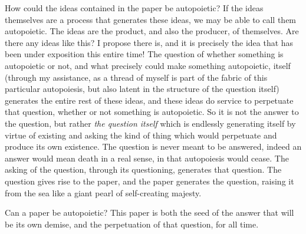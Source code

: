 \documentclass[12pt]{scrartcl}
\begin{document}
How could the ideas contained in the paper be autopoietic?  If the ideas themselves are a process that generates these ideas, we may be able to call them autopoietic.  The ideas are the product, and also the producer, of themselves.  Are there any ideas like this?  I propose there is, and it is precisely the idea that has been under exposition this entire time!  The question of whether something is autopoietic or not, and what precisely could make something autopoietic, itself (through my assistance, as a thread of myself is part of the fabric of this particular autopoiesis, but also latent in the structure of the question itself) generates the entire rest of these ideas, and these ideas do service to perpetuate that question, whether or not something is autopoietic.  So it is not the answer to the question, but rather \emph{the question itself} which is endlessly generating itself by virtue of existing and asking the kind of thing which would perpetuate and produce its own existence.  The question is never meant to be answered, indeed an answer would mean death in a real sense, in that autopoiesis would cease.  The asking of the question, through its questioning, generates that question.  The question gives rise to the paper, and the paper generates the question, raising it from the sea like a giant pearl of self-creating majesty.

Can a paper be autopoietic?  This paper is both the seed of the answer that will be its own demise, and the perpetuation of that question, for all time.  



\end{document}
